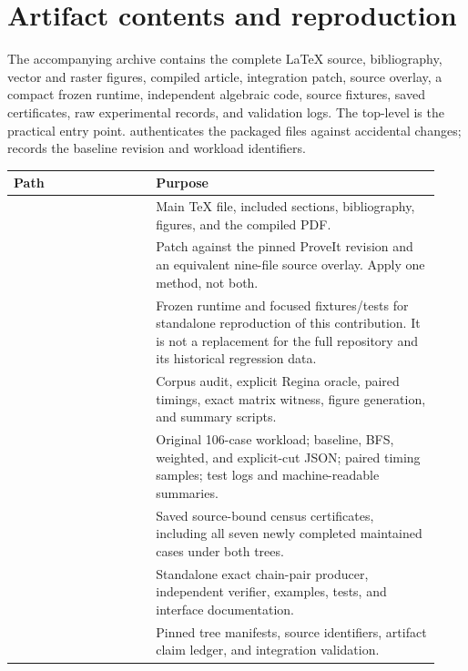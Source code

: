\section{Artifact contents and reproduction}
\label{app:reproduction}

The accompanying archive contains the complete \LaTeX{} source, bibliography,
vector and raster figures, compiled article, integration patch, source
overlay, a compact frozen runtime, independent algebraic code, source
fixtures, saved certificates, raw experimental records, and validation
logs. The top-level  is the practical entry point.
 authenticates the packaged files against accidental
changes;  records the baseline revision
and workload identifiers.

\begin{table}[htbp]
\centering
\begin{tabular}{P{0.31\linewidth}P{0.62\linewidth}}
\toprule
Path & Purpose\\
\midrule
{} & Main TeX file, included sections, bibliography, figures,
and the compiled PDF.\\
 & Patch against the pinned ProveIt revision and an
equivalent nine-file source overlay. Apply one method, not both.\\
 & Frozen runtime and focused fixtures/tests for
standalone reproduction of this contribution. It is not a replacement
for the full repository and its historical regression data.\\
 & Corpus audit, explicit Regina oracle,
paired timings, exact matrix witness, figure generation, and summary
scripts.\\
 & Original 106-case workload; baseline, BFS,
weighted, and explicit-cut JSON; paired timing samples; test logs and
machine-readable summaries.\\
 & Saved source-bound census certificates,
including all seven newly completed maintained cases under both trees.\\
 & Standalone exact chain-pair producer,
independent verifier, examples, tests, and interface documentation.\\
 & Pinned tree manifests, source identifiers, artifact
claim ledger, and integration validation.\\
\bottomrule
\end{tabular}
\end{table}

